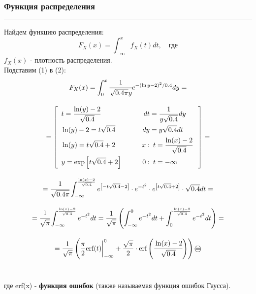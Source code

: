 \documentclass[a4paper, 14pt]{extarticle}
\begin{document}
\subsubsection{Функция распределения}\vspace{-20pt}\rule{\linewidth}{0.1mm}

Найдем функцию распределения:
\begin{equation}
    F_X(x) = \int_{-\infty}^{x} f_X(t) dt, \quad \text{где}
\end{equation}
$f_X(x)$ - плотность распределения.\\

Подставим (1) в (2):
\begin{gather*}
    F_X(x) = 
    \int_{0}^{x} \cfrac{1}{\sqrt{0.4 \pi}y} e^{-(\ln{y} - 2)^2 / 0.4} dy = \\[1em]
    = \left[\hspace{5pt}
    \begin{aligned}
        & t          = \frac{\ln(y)-2}{\sqrt{0.4}}          \qquad & dt &   = \frac{1}{y \sqrt{0.4}} dy   \\
        & \ln(y) - 2 = t \sqrt{0.4}                         \qquad & dy &   = y \sqrt{0.4} dt             \\
        & \ln(y)     = t \sqrt{0.4} + 2                     \qquad & x: & \hspace{5pt} t = \frac{\ln(x)-2}{\sqrt{0.4}} \\
        & y          = \exp \left[ t \sqrt{0.4} + 2 \right] \qquad & 0: & \hspace{5pt} t = -\infty                     \\ 
    \end{aligned}\,
    \hspace{5pt}\right] = \\[1em]
    = \cfrac{1}{\sqrt{0.4 \pi}} \int_{-\infty}^{\frac{\ln(x)-2}{\sqrt{0.4}}} e^{\left[ -t \sqrt{0.4} -2 \right]} 
    \cdot e^{-t^2} \cdot e^{\left[ t \sqrt{0.4} +2 \right]} \cdot \sqrt{0.4} dt = \\[1em]
    = \cfrac{1}{\sqrt{\pi}} \int_{-\infty}^{\frac{\ln(x)-2}{\sqrt{0.4}}} e^{-t^2} dt 
    = \frac{1}{\sqrt{\pi}} \left( \int_{-\infty}^{0} e^{-t^2} dt + \int_{0}^{\frac{\ln(x)-2}{\sqrt{0.4}}} e^{-t^2} dt \right) = \\[1em]
    = \frac{1}{\sqrt{\pi}} \left( \frac{\pi}{2} \text{erf} (t) \bigg|^0_{-\infty} + \frac{\sqrt{\pi}}{2} \cdot 
    \text{erf} \left( \cfrac{\ln(x)-2}{\sqrt{0.4}} \right) \right) \oeq
\end{gather*}\\
\vspace{10pt}
\begin{center}
    где erf(x) - \textbf{функция ошибок} (также называемая функция ошибок Гаусса).\\
\end{center}
\end{document}

